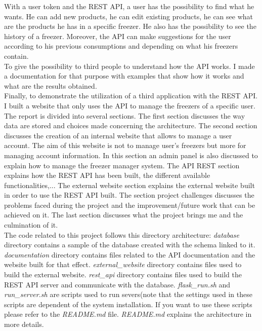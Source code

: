 With a user token and the REST API, a user has the possibility to find what he wants. He can add new products, he can edit existing products, he can see what are the products he has in a specific freezer. He also has the possibility to see the history of a freezer. Moreover, the API can make suggestions for the user according to his previous consumptions and depending on what his freezers contain.\\

To give the possibility to third people to understand how the API works. I made a documentation for that purpose with examples that show how it works and what are the results obtained. \\

Finally, to demonstrate the utilization of a third application with the REST API. I built a website that only uses the API to manage the freezers of a specific user.\\

The report is divided into several sections. The first section discusses the way data are stored and choices made concerning the architecture. The second section discusses the creation of an internal website that allows to manage a user account. The aim of this website is not to manage user's freezers but more for managing account information. In this section an admin panel is also discussed to explain how to manage the freezer manager system. The API REST section explains how the REST API has been built, the different available functionalities,... The external website section explains the external website built in order to use the REST API built. The section project challenges discusses the problems faced during the project and the improvement/future work that can be achieved on it. The last section discusses what the project brings me and the culmination of it.\\

The code related to this project follows this directory architecture:
\textit{database} directory contains a sample of the database created with the schema linked to it. \textit{documentation} directory contains files related to the API documentation and the website built for that effect. \textit{external\_website} directory contains files used to build the external website. \textit{rest\_api} directory contains files used to build the REST API server and communicate with the database. \textit{flask\_run.sh} and \textit{run\_server.sh} are scripts used to run severs(note that the settings used in these scripts are dependent of the system installation. If you want to use these scripts please refer to the \textit{README.md} file. \textit{README.md} explains the architecture in more details.

